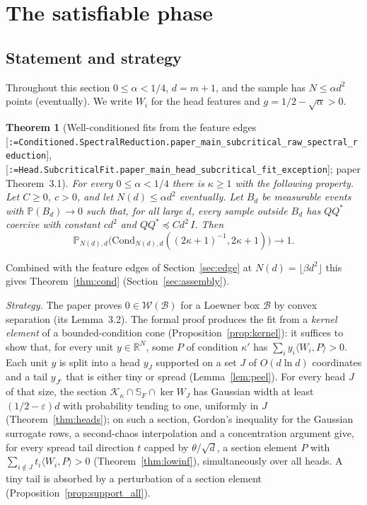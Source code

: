 \documentclass[11pt]{article}
\makeatletter
\newcommand{\formal@break}[1]{\@tfor\formal@tok:=#1\do{%
  \formal@tok
  \expandafter\ifx\formal@tok.\allowbreak\else
  \expandafter\ifx\formal@tok\_\allowbreak\fi\fi}}
\DeclareRobustCommand{\formal}[1]{\textnormal{[\texttt{\small\formal@break{#1}}]}}
\newcommand{\R}{\mathbb{R}}
\newcommand{\Prob}{\mathbb{P}}
\newcommand{\ip}[2]{\langle #1, #2\rangle}
\newcommand{\Fro}{F}
\newcommand{\sqd}{\sqrt{d}}
\newcommand{\Id}{I}
\newcommand{\cone}{\mathcal{K}}
\newcommand{\Cond}{\mathrm{Cond}}
\theoremstyle{plain}
\newtheorem{theorem}{Theorem}[section]
\theoremstyle{definition}
\makeatother
\begin{document}
\section{The satisfiable phase}\label{sec:sat}

\subsection{Statement and strategy}

Throughout this section $0 \le \alpha < 1/4$, $d = m + 1$, and the sample
has $N \le \alpha d^2$ points (eventually). We write $W_i$ for the head
features and $g = 1/2 - \sqrt\alpha > 0$.

\begin{theorem}[Well-conditioned fits from the feature edges \formal{Conditioned.SpectralReduction.paper\_main\_subcritical\_raw\_spectral\_reduction}, \formal{Head.SubcriticalFit.paper\_main\_head\_subcritical\_fit\_exception}; paper Theorem~3.1]\label{thm:sat}
For every $0 \le \alpha < 1/4$ there is $\kappa \ge 1$ with the following
property. Let $C \ge 0$, $c > 0$, and let $N(d) \le \alpha d^2$ eventually.
Let $B_d$ be measurable events with $\Prob(B_d) \to 0$ such that, for all
large $d$, every sample outside $B_d$ has $QQ^{*}$ coercive with constant
$cd^2$ and $QQ^{*} \preceq Cd^2\,\Id$. Then
\[
\Prob_{N(d),d}\bigl(\Cond_{N(d),d}((2\kappa+1)^{-1}, 2\kappa + 1)\bigr) \to 1 .
\]
\end{theorem}

Combined with the feature edges of Section~\ref{sec:edge} at
$N(d) = \lfloor\beta d^2\rfloor$ this gives Theorem~\ref{thm:cond}
(Section~\ref{sec:assembly}).

\emph{Strategy.} The paper proves $0 \in \mathcal{W}(\mathcal{B})$ for a
Loewner box $\mathcal{B}$ by convex separation (its Lemma~3.2). The formal
proof produces the fit from a \emph{kernel element} of a bounded-condition
cone (Proposition~\ref{prop:kernel}): it suffices to show that, for every
unit $y \in \R^N$, some $P$ of condition $\kappa'$ has
$\sum_iy_i\ip{W_i}{P} > 0$. Each unit $y$ is split into a head $y_J$
supported on a set $J$ of $O(d\ln d)$ coordinates and a tail $y_{J^c}$ that
is either tiny or spread (Lemma~\ref{lem:peel}). For every head $J$ of
that size, the section $\cone_{\kappa}\cap\mathbb{S}_\Fro\cap\ker W_J$ has
Gaussian width at least $(1/2 - \varepsilon)d$ with probability tending to
one, uniformly in $J$ (Theorem~\ref{thm:heads}); on such a section, Gordon's
inequality for the Gaussian surrogate rows, a second-chaos interpolation and
a concentration argument give, for every spread tail direction $t$ capped
by $\theta/\sqd$, a section element $P$ with $\sum_{i\notin J}t_i\ip{W_i}{P} > 0$
(Theorem~\ref{thm:lowinf}), simultaneously over all heads. A tiny tail is
absorbed by a perturbation of a section element (Proposition~\ref{prop:support_all}).
\end{document}
